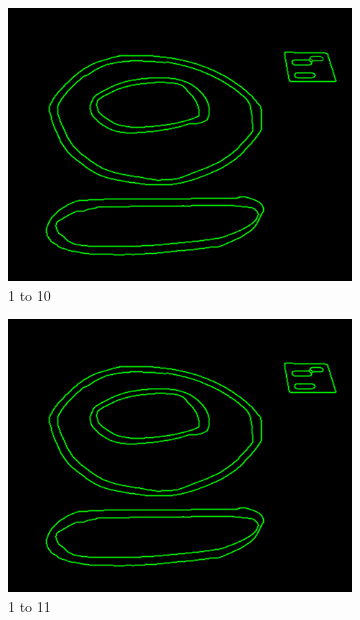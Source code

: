 \documentclass[11pt]{article}
\begin{document}
\begin{figure}
	
	\begin{subfigure}[t]{0.32\textwidth}
	\centering
		\includegraphics[scale=0.28]{pics/elimination/joinedAfterRemoval10.png}
		\caption{1 to 10}
		\label{construction10}
	\end{subfigure}
	\begin{subfigure}[t]{0.32\textwidth}
	\centering
		\includegraphics[scale=0.28]{pics/elimination/joinedAfterRemoval11.png}
		\caption{1 to 11}
		\label{construction11}
	\end{subfigure}
	\begin{subfigure}[t]{0.32\textwidth}
	\centering

\end{subfigure}
\end{figure}
\end{document}
